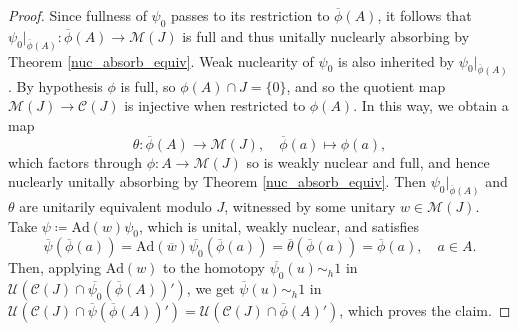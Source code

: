 \documentclass[reqno]{amsart}
\theoremstyle{definition}
\theoremstyle{remark}
\numberwithin{equation}{section}
\theoremstyle{definition}
\newcommand{\calC}{\mathcal{C}}
\newcommand{\calM}{\mathcal{M}}
\newcommand{\calU}{\mathcal{U}}
\begin{document}
\begin{proof}
Since fullness of $\psi_{0}$ passes to its restriction to $\overline{\phi}(A)$, it follows that $\psi_{0}|_{\overline{\phi}(A)}: \overline{\phi}(A)\rightarrow \calM(J)$ is full and thus unitally nuclearly absorbing by Theorem \ref{nuc_absorb_equiv}. Weak nuclearity of $\psi_{0}$ is also inherited by $\psi_{0}|_{\overline{\phi}(A)}$. By hypothesis $\phi$ is full, so $\phi(A)\cap J = \{0\}$, and so the quotient map $\mathcal M(J)\to\mathcal C(J)$ is injective when restricted to $\phi(A)$. In this way, we obtain a map 
\begin{equation} 
\theta: \overline{\phi}(A) \rightarrow \calM(J), \quad \overline{\phi}(a)\mapsto \phi(a), 
\end{equation}
which factors through $\phi\colon A\to\mathcal M(J)$ so is weakly nuclear and full, and hence nuclearly unitally absorbing  by Theorem \ref{nuc_absorb_equiv}. Then $\psi_{0}|_{\overline{\phi}(A)}$ and $\theta$ are unitarily equivalent modulo $J$, witnessed by some unitary $w\in \calM(J)$. Take $\psi \coloneqq \mathrm{Ad}(w) \psi_{0}$, which is unital, weakly nuclear, and satisfies
\begin{equation} 
\overline{\psi}(\overline{\phi}(a)) = \mathrm{Ad}(\overline{w}) \overline{\psi_{0}}(\overline{\phi}(a)) = \overline{\theta} (\overline{\phi}(a)) = \overline{\phi}(a),\quad a\in A. 
\end{equation} 
Then, applying $\mathrm{Ad}(w)$ to the homotopy $\overline{\psi_{0}}(u)\sim_{h}1$ in $\calU(\calC(J)\cap \overline{\psi_{0}}(\overline{\phi}(A))')$, we get $\overline{\psi}(u)\sim_{h}1$ in $\calU(\calC(J)\cap \overline{\psi}(\overline{\phi}(A)) ') = \calU(\calC(J)\cap \overline{\phi}(A)')$, which proves the claim. 


\end{proof}
\end{document}
